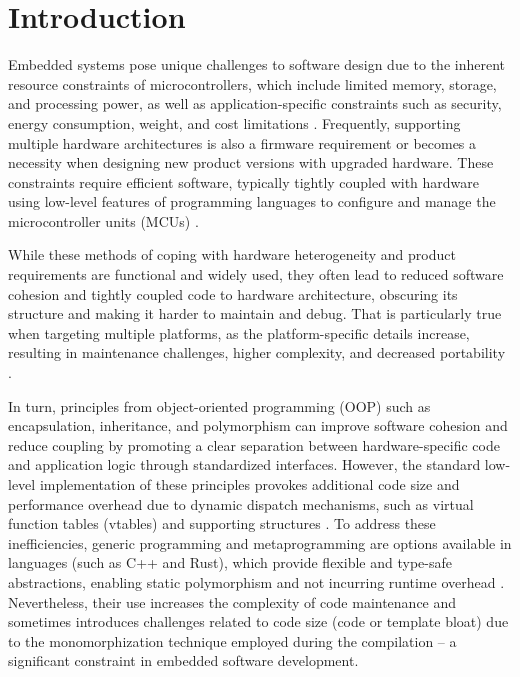 \documentclass[sigconf]{acmart}
\begin{document}

\maketitle

\section{Introduction}

Embedded systems pose unique challenges to software design due to the inherent resource constraints of microcontrollers, which include limited memory, storage, and processing power, as well as application-specific constraints such as security, energy consumption, weight, and cost limitations \cite{buttazzo2006}. Frequently, supporting multiple hardware architectures is also a firmware requirement or becomes a necessity when designing new product versions with upgraded hardware. These constraints require efficient software, typically tightly coupled with hardware using low-level features of programming languages to configure and manage the microcontroller units (MCUs) \cite{varoumas2023}.

While these methods of coping with hardware heterogeneity and product requirements are functional and widely used, they often lead to reduced software cohesion and tightly coupled code to hardware architecture, obscuring its structure and making it harder to maintain and debug. That is particularly true when targeting multiple platforms, as the platform-specific details increase, resulting in maintenance challenges, higher complexity, and decreased portability \cite{pappas2024semantic,ernst2002empirical,cppdesign}.

In turn, principles from object-oriented programming (OOP) such as encapsulation, inheritance, and polymorphism can improve software cohesion and reduce coupling by promoting a clear separation between hardware-specific code and application logic through standardized interfaces. However, the standard low-level implementation of these principles provokes additional code size and performance overhead due to dynamic dispatch mechanisms, such as virtual function tables (vtables) and supporting structures \cite{bauer2021novt}. To address these inefficiencies, generic programming and metaprogramming are options available in languages (such as C++ and Rust), which provide flexible and type-safe abstractions, enabling static polymorphism and not incurring runtime overhead \cite{juhasz2023modern}. Nevertheless, their use increases the complexity of code maintenance and sometimes introduces challenges related to code size (code or template bloat) due to the monomorphization technique employed during the compilation \cite{rust2022} -- a significant constraint in embedded software development.
\end{document}
